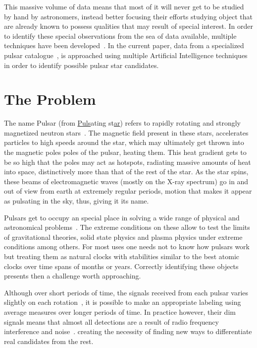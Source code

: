 \documentclass[journal]{IEEEtran}
\begin{document}
This massive volume of data means that most of it will never get to be studied
by hand by astronomers, instead better focusing their efforts studying object
that are already known to possess qualities that may result of special interest.
In order to identify these special observations from the sea of data available,
multiple techniques have been developed~\cite{pulsar:dataset:explanation:lyon}.
In the current paper, data from a specialized pulsar
catalogue~\cite{pulsar:dataset:lyon}, is approached using multiple Artificial
Intelligence techniques in order to identify possible pulsar star candidates.

\section{The Problem\label{sec:problem}} The name Pulsar (from
\underline{Puls}ating st\underline{ar}) refers to rapidly rotating and strongly
magnetized neutron stars~\cite{pulsar:definition:nasa}. The magnetic field
present in these stars, accelerates particles to high speeds around the star,
which may ultimately get thrown into the magnetic poles poles of the pulsar,
heating them. This heat gradient gets to be so high that the poles may act as
hotspots, radiating massive amounts of heat into space, distinctively more than
that of the rest of the star. As the star spins, these beams of electromagnetic
waves (mostly on the X-ray spectrum) go in and out of view from earth at
extremely regular periods, motion that makes it appear as pulsating in the sky,
thus, giving it its name.

Pulsars get to occupy an special place in solving a wide range of physical and
astronomical problems~\cite{pulsar:importance:kramer}. The extreme conditions on
these allow to test the limits of gravitational theories, solid state physics
and plasma physics under extreme conditions among others. For most uses one
needs not to know how pulsars work but treating them as natural clocks with
stabilities similar to the best atomic clocks over time spans of months or
years. Correctly identifying these objects presents then a challenge worth
approaching.

Although over short periods of time, the signals received from each pulsar
varies slightly on each rotation~\cite{pulsar:importance:kramer}, it is possible
to make an appropriate labeling using average measures over longer periods of
time. In practice however, their dim signals means that almost all detections
are a result of radio frequency interference and
noise~\cite{pulsar:dataset:explanation:lyon}. creating the necessity of finding
new ways to differentiate real candidates from the rest.
\end{document}
